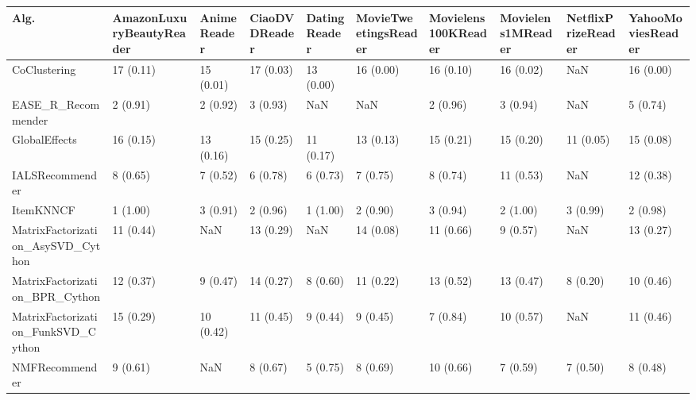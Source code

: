 \begin{tabular}{llllllllll}
\toprule
                               Alg. & AmazonLuxuryBeautyReader & AnimeReader & CiaoDVDReader & DatingReader & MovieTweetingsReader & Movielens100KReader & Movielens1MReader & NetflixPrizeReader & YahooMoviesReader \\
\midrule
                       CoClustering &                17 (0.11) &   15 (0.01) &     17 (0.03) &    13 (0.00) &            16 (0.00) &           16 (0.10) &         16 (0.02) &                NaN &         16 (0.00) \\
                 EASE\_R\_Recommender &                 2 (0.91) &    2 (0.92) &      3 (0.93) &          NaN &                  NaN &            2 (0.96) &          3 (0.94) &                NaN &          5 (0.74) \\
                      GlobalEffects &                16 (0.15) &   13 (0.16) &     15 (0.25) &    11 (0.17) &            13 (0.13) &           15 (0.21) &         15 (0.20) &          11 (0.05) &         15 (0.08) \\
                    IALSRecommender &                 8 (0.65) &    7 (0.52) &      6 (0.78) &     6 (0.73) &             7 (0.75) &            8 (0.74) &         11 (0.53) &                NaN &         12 (0.38) \\
                          ItemKNNCF &                 1 (1.00) &    3 (0.91) &      2 (0.96) &     1 (1.00) &             2 (0.90) &            3 (0.94) &          2 (1.00) &           3 (0.99) &          2 (0.98) \\
  MatrixFactorization\_AsySVD\_Cython &                11 (0.44) &         NaN &     13 (0.29) &          NaN &            14 (0.08) &           11 (0.66) &          9 (0.57) &                NaN &         13 (0.27) \\
     MatrixFactorization\_BPR\_Cython &                12 (0.37) &    9 (0.47) &     14 (0.27) &     8 (0.60) &            11 (0.22) &           13 (0.52) &         13 (0.47) &           8 (0.20) &         10 (0.46) \\
 MatrixFactorization\_FunkSVD\_Cython &                15 (0.29) &   10 (0.42) &     11 (0.45) &     9 (0.44) &             9 (0.45) &            7 (0.84) &         10 (0.57) &                NaN &         11 (0.46) \\
                     NMFRecommender &                 9 (0.61) &         NaN &      8 (0.67) &     5 (0.75) &             8 (0.69) &           10 (0.66) &          7 (0.59) &           7 (0.50) &          8 (0.48) \\

\end{tabular}
